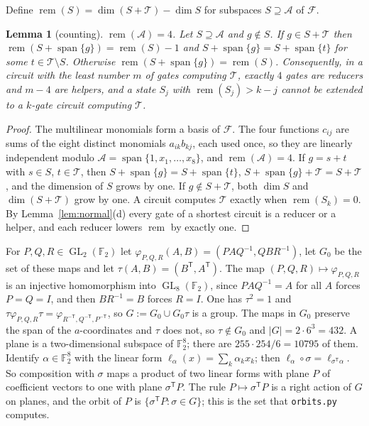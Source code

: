 \documentclass[11pt,a4paper]{article}
\newtheorem{lemma}[theorem]{Lemma}
\theoremstyle{definition}
\newcommand{\F}{\mathbb{F}}
\newcommand{\Fn}{\mathcal{F}}
\newcommand{\Aff}{\mathcal{A}}
\newcommand{\Tg}{\mathcal{T}}
\newcommand{\rem}{\operatorname{rem}}
\newcommand{\spn}{\operatorname{span}}
\newcommand{\GL}{\operatorname{GL}}
\newcommand{\code}[1]{\texttt{#1}}
\begin{document}
Define $\rem(S)=\dim(S+\Tg)-\dim S$ for subspaces $S\supseteq\Aff$ of $\Fn$.

\begin{lemma}[counting]\label{lem:count}
$\rem(\Aff)=4$. Let $S\supseteq\Aff$ and $g\notin S$. If $g\in S+\Tg$ then $\rem(S+\spn\{g\})=\rem(S)-1$ and $S+\spn\{g\}=S+\spn\{t\}$ for some $t\in\Tg\setminus S$. Otherwise $\rem(S+\spn\{g\})=\rem(S)$. Consequently, in a circuit with the least number $m$ of gates computing $\Tg$, exactly $4$ gates are reducers and $m-4$ are helpers, and a state $S_j$ with $\rem(S_j)>k-j$ cannot be extended to a $k$-gate circuit computing $\Tg$.
\end{lemma}

\begin{proof}
The multilinear monomials form a basis of $\Fn$. The four functions $c_{ij}$ are sums of the eight distinct monomials $a_{ik}b_{kj}$, each used once, so they are linearly independent modulo $\Aff=\spn\{1,x_1,\dots,x_8\}$, and $\rem(\Aff)=4$. If $g=s+t$ with $s\in S$, $t\in\Tg$, then $S+\spn\{g\}=S+\spn\{t\}$, $S+\spn\{g\}+\Tg=S+\Tg$, and the dimension of $S$ grows by one. If $g\notin S+\Tg$, both $\dim S$ and $\dim(S+\Tg)$ grow by one. A circuit computes $\Tg$ exactly when $\rem(S_k)=0$. By Lemma~\ref{lem:normal}(d) every gate of a shortest circuit is a reducer or a helper, and each reducer lowers $\rem$ by exactly one.
\end{proof}

For $P,Q,R\in\GL_2(\F_2)$ let $\varphi_{P,Q,R}(A,B)=(PAQ^{-1},QBR^{-1})$, let $G_0$ be the set of these maps and let $\tau(A,B)=(B^{\mathsf T},A^{\mathsf T})$. The map $(P,Q,R)\mapsto\varphi_{P,Q,R}$ is an injective homomorphism into $\GL_8(\F_2)$, since $PAQ^{-1}=A$ for all $A$ forces $P=Q=I$, and then $BR^{-1}=B$ forces $R=I$. One has $\tau^2=1$ and $\tau\varphi_{P,Q,R}\tau=\varphi_{R^{-\mathsf T},Q^{-\mathsf T},P^{-\mathsf T}}$, so $G:=G_0\cup G_0\tau$ is a group. The maps in $G_0$ preserve the span of the $a$-coordinates and $\tau$ does not, so $\tau\notin G_0$ and $|G|=2\cdot6^3=432$. A plane is a two-dimensional subspace of $\F_2^8$; there are $255\cdot254/6=10795$ of them. Identify $\alpha\in\F_2^8$ with the linear form $\ell_\alpha(x)=\sum_k \alpha_kx_k$; then $\ell_\alpha\circ\sigma=\ell_{\sigma^{\mathsf T}\alpha}$. So composition with $\sigma$ maps a product of two linear forms with plane $P$ of coefficient vectors to one with plane $\sigma^{\mathsf T}P$. The rule $P\mapsto\sigma^{\mathsf T}P$ is a right action of $G$ on planes, and the orbit of $P$ is $\{\sigma^{\mathsf T}P:\sigma\in G\}$; this is the set that \code{orbits.py} computes.
\end{document}
